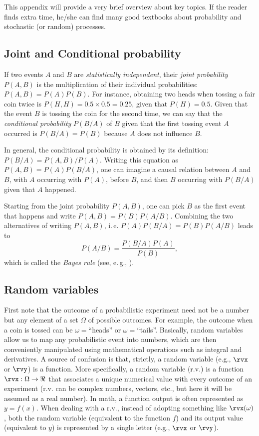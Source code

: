 This appendix will provide a very brief overview about key topics. If the reader finds extra time, he/she can 
find many good textbooks about probability and stochastic (or random) processes.

\subsection{Joint and Conditional probability}

If two events $A$ and $B$ are \emph{statistically independent}, their \emph{joint probability} $P(A,B)$ is the multiplication of their individual probabilities: $P(A,B)=P(A)P(B)$. For instance, obtaining two heads when tossing a fair coin twice is $P(H,H) = 0.5 \times 0.5 = 0.25$, given that $P(H)=0.5$. Given that the event $B$ is tossing the coin for the second time, we can say that the \emph{conditional probability} $P(B/A)$ of $B$ given that the first tossing event $A$ occurred is $P(B/A) = P(B)$ because $A$ does not influence $B$.

In general, the conditional probability is obtained by its definition: $P(B/A) = P(A,B)/P(A)$. Writing this equation as 
$P(A,B) = P(A) P(B/A)$, one can imagine a causal relation between $A$ and $B$, with $A$ occurring with $P(A)$, before $B$, and then $B$ occurring with $P(B/A)$ given that $A$ happened.

Starting from the joint probability $P(A,B)$, one can pick $B$ as the first event that happens and write $P(A,B) = P(B) P(A/B)$. Combining the two alternatives of writing $P(A,B)$, i.\,e. $P(A) P(B/A) = P(B) P(A/B)$ leads to
\begin{equation}
P(A/B) = \frac{P(B/A)P(A)}{P(B)},
\label{eq:bayes_rule}
\end{equation}
which is called the \emph{Bayes rule} (see, e.\,g., ).

\subsection{Random variables}

First note that the outcome of a probabilistic experiment need not be a number but any element of a set $\Omega$ of possible outcomes. For example, the outcome when a coin is tossed can be $\omega=$``heads'' or $\omega=$``tails''. 
Basically, random variables allow us to map any probabilistic event into numbers, which are then conveniently manipulated using mathematical operations such as integral and derivatives.
A source of confusion is that, strictly, a random variable (e.g., $\rvx$ or $\rvy$) is a function. 
More specifically, a random variable (r.v.) is a function $\rvx : \Omega \rightarrow \Re$ that associates a unique numerical value with every outcome of an experiment (r.v. can be complex numbers, vectors, etc., but here it will be assumed as a real number). In math, a function output is often represented as $y=f(x)$.  When dealing with a r.v., instead of adopting something like $\rvx(\omega)$, both the random variable (equivalent to the function $f$) and its output value (equivalent to $y$) is represented by a single letter (e.g., $\rvx$ or $\rvy$).

